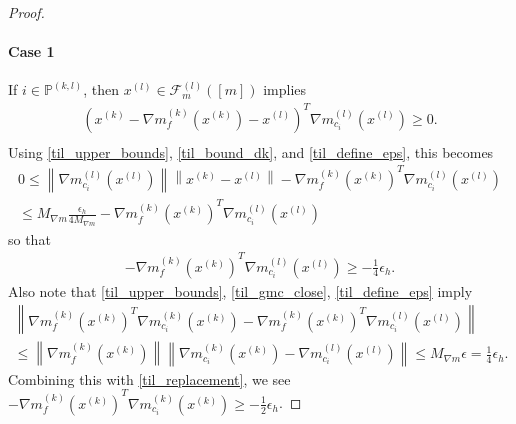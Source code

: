 \documentclass{article}
\newenvironment{comment}
  {\par\medskip
   \color{red}%
   \begin{framed}
   \textbf{Comment: }\ignorespaces}
 {\end{framed}
  \medskip}
\theoremstyle{case}
\numberwithin{theorem}{subsection}
\newcommand{\feasiblel}{{\mathcal F_m^{(l)}}}
\newcommand{\gk}{{\nabla m_f^{(k)}\left(\xk\right)}}
\newcommand{\gmcik}{{\nabla m_{c_i}^{(k)}\left(\xk\right)}}
\newcommand{\gmcil}{{\nabla m_{c_i}^{(l)}\left(\xl\right)}}
\newcommand{\mcil}{{{m}^{(l)}_{c_i}}}
\newcommand{\xk}{x^{(k)}}
\newcommand{\xl}{{x^{(l)}}}
\newcommand{\projkl}{{p^{(k,l)}}}
\newcommand{\activeprojkl}{{\mathbb P^{(k, l)}}}
\newcommand{\maxmodelgrad}{{M_{\nabla m}}}
\newcommand{\huffeps}{{\epsilon_h}}
\begin{document}
\begin{proof}
\paragraph{Case 1}
% 
% 
% 



If $i \in \activeprojkl$, then $\xl \in \feasiblel\left([m]\right)$ implies
\begin{align*}
\left(\xk - \gk - \xl\right)^T \gmcil \ge 0. \\
\end{align*}
Using \cref{til_upper_bounds}, \cref{til_bound_dk}, and \cref{til_define_eps}, this becomes
\begin{align*}
0 \le \left\| \gmcil \right\| \left\|\xk - \xl \right\|- \gk^T \gmcil \\
\le \maxmodelgrad \frac {\huffeps} {4\maxmodelgrad} - \gk^T \gmcil
\end{align*}
so that
\begin{align}
\label{til_replacement}
- \gk^T \gmcil \ge -\frac 1 4 \huffeps .
\end{align}
Also note that \cref{til_upper_bounds}, \cref{til_gmc_close}, \cref{til_define_eps} imply
\begin{align*}
\left\|
 \gk^T \gmcik
-\gk^T \gmcil
\right\| \\
\le \left\|\gk\right\| \left\|\gmcik - \gmcil\right\|
\le \maxmodelgrad \epsilon = \frac 1 {4} \huffeps.
\end{align*}
Combining this with \cref{til_replacement}, we see $-\gk^T \gmcik \ge - \frac 1 2 \huffeps$.

\end{proof}
\end{document}
